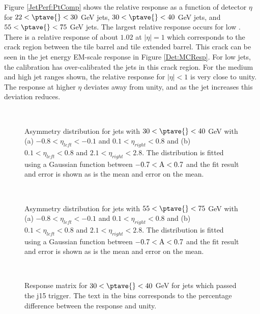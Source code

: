 Figure \ref{JetPerf:PtComp} shows the relative response as a function of detector $\eta$ for $22<\ptave{}<30$ GeV jets, $30<\ptave{}<40$ GeV jets, and $55<\ptave{}<75$ GeV jets. 
The largest relative response occurs for low \ptave{}.
There is a relative response of about $1.02$ at $|\eta|=1$ which corresponds to the crack region between the tile barrel and tile extended barrel. 
This crack can be seen in the jet energy EM-scale response in Figure \ref{Det:MCResp}.
For low \pt{} jets, the calibration has over-calibrated the jets in this crack region. 
For the medium and high jet \pt{} ranges shown, the relative response for $|\eta|<1$ is very close to unity.
The response at higher $\eta{}$ deviates away from unity, and as the jet \pt{} increases this deviation reduces. 

\begin{figure}
\centering
\mbox{
}
\mbox{
}
\caption[Example asymmetry distribution for jets with $30<\ptave{}<40$ GeV]{
Asymmetry distribution for jets with $30<\ptave{}<40$ GeV with (a) $-0.8<\eta_{left}<-0.1$ and $0.1<\eta_{right}<0.8$ and (b)  $0.1<\eta_{left}<0.8$ and $2.1<\eta_{right}<2.8$.
The distribution is fitted using a Gaussian function between $\rm{-0.7<A<0.7}$ and the fit result and error is shown as is the mean and error on the mean. 
\label{JetPerf:Asym_j15}}
\end{figure}

\begin{figure}
\centering
\mbox{
}
\mbox{
}

\caption[Example asymmetry distribution for jets with $55<\ptave{}<75$ GeV]{
Asymmetry distribution for jets with $55<\ptave{}<75$ GeV with (a) $-0.8<\eta_{left}<-0.1$ and $0.1<\eta_{right}<0.8$ and (b)  $0.1<\eta_{left}<0.8$ and $2.1<\eta_{right}<2.8$.
The distribution is fitted using a Gaussian function between $\rm{-0.7<A<0.7}$ and the fit result and error is shown as is the mean and error on the mean. 
\label{JetPerf:Asym_j30}}
\end{figure}

\begin{figure}
\centering
\mbox{
}
\caption[The response matrix for jets with $30<\ptave{}<40$ GeV]{
Response matrix for $30<\ptave{}<40$ GeV for jets which passed the j15 trigger. 
The text in the bins corresponds to the percentage difference between the response and unity.
\label{JetPerf:ResponseMatrix_30_40_j15}}
\end{figure}

